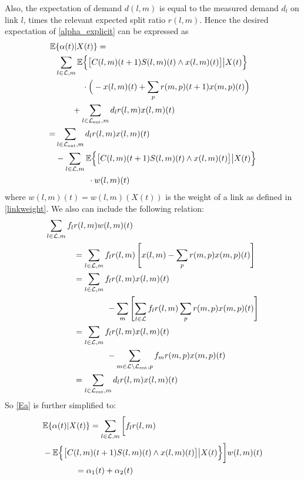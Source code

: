 \vspace{0.5cm}

Also, the expectation of demand $d(l,m)$ is equal to the measured demand $d_{l}$ on link $l$, times the relevant expected split ratio $r(l,m)$. 
Hence the desired expectation of \eqref{alpha_explicit} can be expressed as
\begin{align} 
\nonumber \mathbb{E} & \{\alpha (t) | X(t)\}= \\
\nonumber & \sum_{l \in \linkset,m} \expectation{ \big[C(l,m)(t+1)S(l,m)(t)\wedge x(l,m)(t)\big]\big| X(t)}\\
\nonumber & \qquad \quad  \;   \cdot \Big(-x(l,m)(t) + \sum_{p}r(m,p)(t+1)x(m,p)(t)\Big) \\
 \nonumber &\qquad + \sum_{l \in \entrylinks,m} d_l r(l,m) x(l,m)(t)  \\
 \nonumber =& \sum_{l \in \entrylinks,m} d_l r(l,m) x(l,m)(t) \\
\nonumber &- \sum_{l \in \linkset,m} \expectation{ \big[C(l,m)(t+1)S(l,m)(t)\wedge x(l,m)(t)\big] \big| X(t)} \\  
\label{Ea} &\qquad \qquad \cdot w(l,m)(t)
\end{align}
where $w(l,m)(t) = w(l,m)(X(t))$ is the weight of a link as defined in \eqref{linkweight}. 
We also can include the following relation: 
\begin{align*}
\sum_{l \in \mathcal{L},m} f_l &r(l,m) w(l,m)(t) \\ 
& = \sum_{l \in \mathcal{L},m} f_l r(l,m) \left[ x(l,m) - \sum_p r(m,p)x(m,p)(t) \right] \\
& = \sum_{l \in \mathcal{L},m} f_l r(l,m)x(l,m)(t) \\
&\qquad \qquad - \sum_m  \left[ \sum_{l\in\mathcal{L}} f_l r(l,m) \sum_p r(m,p)x(m,p)(t) \right] \\
& = \sum_{l \in \mathcal{L},m} f_l r(l,m)x(l,m)(t)\\
&\qquad \qquad  - \sum_{m\in \mathcal{L} \backslash \mathcal{L}_{\text{ent}}, p}   f_m r(m,p)x(m,p)(t) \\ 
& =  \sum_{l \in \mathcal{L}_{\text{ent}},m} d_l r(l,m)x(l,m)(t)
\end{align*}
So \eqref{Ea} is further simplified to: 
\begin{align} \label{expected_short}
 & \mathbb{E}\{\alpha (t) | X(t)\} = \sum_{l \in \linkset,m} \bigg[ f_l r(l,m)  \\
 \nonumber  & - \expectation{ \big[C(l,m)(t+1)S(l,m)(t)\wedge x(l,m)(t)\big] \big| X(t)}  \bigg] w(l,m)(t)  \\  
 & \qquad \qquad = \alpha_1 (t) + \alpha_2 (t) \nonumber
\end{align}
